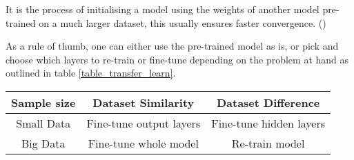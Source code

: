 It is the process of initialising a model using the weights of another model pre-trained on a much larger dataset, this usually ensures faster convergence. (\cite{shanmugamani2018deep})

As a rule of thumb, one can either use the pre-trained model as is, or pick and choose which layers to re-train or fine-tune depending on the problem at hand as outlined in table \ref{table_transfer_learn}.

\begin{center}
    \begin{tabular}{c|c|c}     \label{table_transfer_learn}
    \textbf{Sample size} & \textbf{Dataset Similarity} & \textbf{Dataset Difference} \\
    \hline
    Small Data 
    & Fine-tune output layers
    & Fine-tune hidden layers \\
    \hline
    Big Data 
    & Fine-tune whole model
    & Re-train model \\
    \end{tabular}
\end{center}
